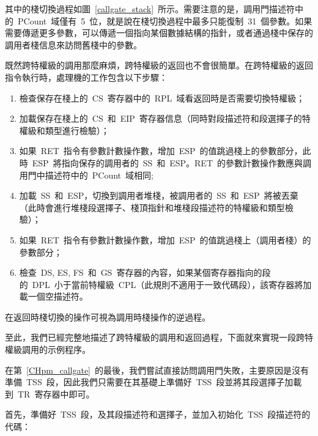 
其中的棧切換過程如圖~\ref{callgate_stack}~所示。需要注意的是，調用門描述符中的~PCount~域僅有~5~位，就是說在棧切換過程中最多只能復制~31~個參數。如果需要傳遞更多參數，可以傳遞一個指向某個數據結構的指針，或者通過棧中保存的調用者棧信息來訪問舊棧中的參數。

既然跨特權級的調用那麼麻煩，跨特權級的返回也不會很簡單。在跨特權級的返回指令執行時，處理機的工作包含以下步驟：

\begin{enumerate}
\item 檢查保存在棧上的~CS~寄存器中的~RPL~域看返回時是否需要切換特權級；
\item 加載保存在棧上的~CS~和~EIP~寄存器信息（同時對段描述符和段選擇子的特權級和類型進行檢驗）；
\item 如果~RET~指令有參數計數操作數，增加~ESP~的值跳過棧上的參數部分，此時~ESP~將指向保存的調用者的~SS~和~ESP。RET~的參數計數操作數應與調用門中描述符中的~PCount~域相同;
\item 加載~SS~和~ESP，切換到調用者堆棧，被調用者的~SS~和~ESP~將被丟棄（此時會進行堆棧段選擇子、棧頂指針和堆棧段描述符的特權級和類型檢驗）；
\item 如果~RET~指令有參數計數操作數，增加~ESP~的值跳過棧上（調用者棧）的參數部分；
\item 檢查~DS, ES, FS~和~GS~寄存器的內容，如果某個寄存器指向的段的~DPL~小于當前特權級~CPL（此規則不適用于一致代碼段），該寄存器將加載一個空描述符。
\end{enumerate}

在返回時棧切換的操作可視為調用時棧操作的逆過程。

至此，我們已經完整地描述了跨特權級的調用和返回過程，下面就來實現一段跨特權級調用的示例程序。

在第~\ref{CHpm_callgate}~的最後，我們嘗試直接訪問調用門失敗，主要原因是沒有準備~TSS~段，因此我們只需要在其基礎上準備好~TSS~段並將其段選擇子加載到~TR~寄存器中即可。

首先，準備好~TSS~段，及其段描述符和選擇子，並加入初始化~TSS~段描述符的代碼：

\label{CHpm_tss_desc}

